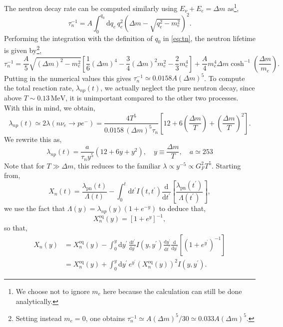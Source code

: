 \documentclass[11pt]{article}
\numberwithin{equation}{section}
\numberwithin{figure}{section}
\numberwithin{table}{section}
\begin{document}
The neutron decay rate can be computed similarly using $E_\nu + E_e= \Delta m$ as\footnote{We choose not to ignore $m_e$ here because the calculation can still be done analytically.},
\begin{equation}
\tau_n^{-1} = A \int_0^{q_0}{\mathrm{d}q_e \, q_e^2 \left(\Delta m - \sqrt{q_e^2 - m_e^2}\right)^2}.
\end{equation}
Performing the integration with the definition of $q_0$ in \eqref{eq:tn}, the neutron lifetime is given by\footnote{Setting instead $m_e = 0$, one obtains $\tau_n^{-1} \simeq A(\Delta m)^5/30 \simeq 0.033 A (\Delta m)^5$.},
\begin{equation}
\tau_n^{-1} = \frac{A}{5}\sqrt{(\Delta m)^2 - m_e^2}\left[\frac{1}{6}(\Delta m)^4 - \frac{3}{4}(\Delta m)^2 m_e^2 - \frac{2}{3}m_e^4\right] + \frac{A}{4}m_e^4 \Delta m \cosh^{-1}\left(\frac{\Delta m}{m_e}\right).
\end{equation}
Putting in the numerical values this gives $\tau_n^{-1} \simeq 0.0158 A (\Delta m)^5$. To compute the total reaction rate, $\lambda_{np}(t)$, we actually neglect the pure neutron decay, since above $T \sim 0.13\, \mathrm{MeV}$, it is unimportant compared to the other two processes. With this in mind, we obtain,
\begin{equation}
\lambda_{np}(t) \simeq 2 \lambda(n \nu_e \rightarrow p e^{-}) = \frac{4 T^5}{0.0158 \, (\Delta m)^5 \tau_n} \left[12 + 6 \left(\frac{\Delta m}{T}\right)+ \left(\frac{\Delta m}{T}\right)^2\right].
\end{equation}
We rewrite this as,
\begin{equation}
\lambda_{np}(t) = \frac{a}{\tau_n y^5} (12 + 6y + y^2), \quad y \equiv \frac{\Delta m}{T}, \quad a \simeq 253
\end{equation}
Note that for $T \gg \Delta m$, this reduces to the familiar $\lambda \propto y^{-5} \propto G_F^2 T^5$. Starting from,
\begin{equation}
X_n(t) = \frac{\lambda_{\mathrm{pn}}(t)}{\Lambda(t)}-\int_{0}^{t} \mathrm{d} t^{\prime} I\left(t, t^{\prime}\right) \frac{\mathrm{d}}{\mathrm{d} t^{\prime}}\left[\frac{\lambda_{\mathrm{pn}}\left(t^{\prime}\right)}{\Lambda\left(t^{\prime}\right)}\right],
\end{equation}
we use the fact that $\Lambda(y) = \lambda_{np}(y)(1 + e^{-y})$ to deduce that,
\begin{equation}
X_n^{\mathrm{eq}}(y) = \left[1 + e^{y}\right]^{-1},
\end{equation}
so that,
\begin{align*}
X_n(y) &= X_n^{\mathrm{eq}}(y) - \int_0^{y}{\mathrm{d}y^{\prime}\, \frac{\mathrm{d}t^{\prime}}{\mathrm{d}y^{\prime}}I(y, y^{\prime}) \frac{\mathrm{d}y^{\prime}}{\mathrm{d}t^{\prime}}\frac{\mathrm{d}}{\mathrm{d}y^{\prime}}\left[(1 + e^{y^{\prime}})^{-1}\right]} \\
&= X_n^{\mathrm{eq}}(y) + \int_0^{y}{\mathrm{d}y^{\prime} \, e^{y^\prime} \left(X_n^{\mathrm{eq}}(y)\right)^2 I(y, y^{\prime})}.
\end{align*}
\end{document}
